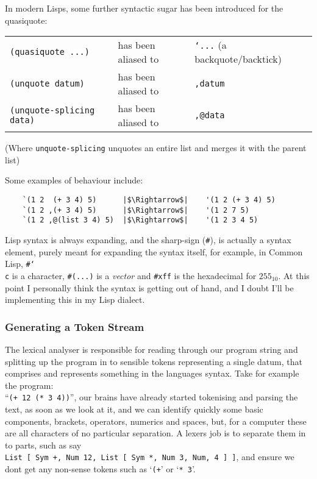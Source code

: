 \documentclass{article}
\newcommand{\code}[1]{\texttt{#1}}
\begin{document}
    In modern Lisps, some further syntactic sugar has been introduced
    for the quasiquote:\\

    \begin{tabular}{lll}
        \code{(quasiquote ...)}       & has been aliased to& \code{`...} (a backquote/backtick)\\
        \code{(unquote datum)}        & has been aliased to& \code{,datum}\\
        \code{(unquote-splicing data)}& has been aliased to& \code{,@data}
    \end{tabular}

    {\small(Where \code{unquote-splicing} unquotes an entire list and merges it with
    the parent list)}

    Some examples of behaviour include:
    \begin{verbatim}
    `(1 2  (+ 3 4) 5)      |$\Rightarrow$|    '(1 2 (+ 3 4) 5)
    `(1 2 ,(+ 3 4) 5)      |$\Rightarrow$|    '(1 2 7 5)
    `(1 2 ,@(list 3 4) 5)  |$\Rightarrow$|    '(1 2 3 4 5)
    \end{verbatim}

    Lisp syntax is always expanding, and the sharp-sign (\code{\#}), is actually
    a syntax element, purely meant for expanding the syntax itself, for example,
    in Common Lisp, \code{\#{\char`\\}c} is a character, \code{\#(...)} is a
    \emph{vector} and \code{\#xff} is the hexadecimal for $255_{10}$. At this point
    I personally think the syntax is getting out of hand, and I doubt I'll be
    implementing this in my Lisp dialect.

    \subsubsection{Generating a Token Stream}
      The lexical analyser is responsible for reading through our program string
      and splitting up the program in to sensible tokens representing a single
      datum, that comprises and represents something in the languages syntax.
      Take for example the program:\\``\code{(+ 12 (* 3 4))}'', our brains have
      already started tokenising and parsing the text, as soon as we look at it,
      and we can identify quickly some basic components, brackets, operators,
      numerics and spaces, but, for a computer these are all characters of no
      particular separation. A lexers job is to separate them in to parts, such
      as say\\\code{List [ Sym +, Num 12, List [ Sym *, Num 3, Num, 4 ] ]}, and
      ensure we dont get any non-sense tokens such as `\code{(+}' or `\code{* 3}'.
\end{document}
